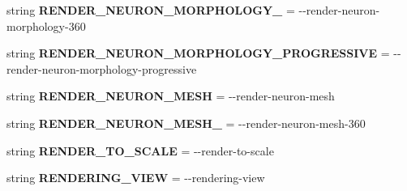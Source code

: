 \begin{DoxyCompactItemize}
\item 
string {\bfseries R\+E\+N\+D\+E\+R\+\_\+\+N\+E\+U\+R\+O\+N\+\_\+\+M\+O\+R\+P\+H\+O\+L\+O\+G\+Y\+\_} = \textquotesingle{}-\/-\/render-\/neuron-\/morphology-\/360\textquotesingle{}\hypertarget{classmeshy_1_1neuromorphovis_1_1interface_1_1cli_1_1args_1_1Args_a6297b735265b3cc48c2e38d07e1dd5dd}{}\label{classmeshy_1_1neuromorphovis_1_1interface_1_1cli_1_1args_1_1Args_a6297b735265b3cc48c2e38d07e1dd5dd}

\item 
string {\bfseries R\+E\+N\+D\+E\+R\+\_\+\+N\+E\+U\+R\+O\+N\+\_\+\+M\+O\+R\+P\+H\+O\+L\+O\+G\+Y\+\_\+\+P\+R\+O\+G\+R\+E\+S\+S\+I\+VE} = \textquotesingle{}-\/-\/render-\/neuron-\/morphology-\/progressive\textquotesingle{}\hypertarget{classmeshy_1_1neuromorphovis_1_1interface_1_1cli_1_1args_1_1Args_a1a1cd12d152f6aa891bcc73afd60eb0d}{}\label{classmeshy_1_1neuromorphovis_1_1interface_1_1cli_1_1args_1_1Args_a1a1cd12d152f6aa891bcc73afd60eb0d}

\item 
string {\bfseries R\+E\+N\+D\+E\+R\+\_\+\+N\+E\+U\+R\+O\+N\+\_\+\+M\+E\+SH} = \textquotesingle{}-\/-\/render-\/neuron-\/mesh\textquotesingle{}\hypertarget{classmeshy_1_1neuromorphovis_1_1interface_1_1cli_1_1args_1_1Args_ac73f530a8a91113efbb53d2807e688d8}{}\label{classmeshy_1_1neuromorphovis_1_1interface_1_1cli_1_1args_1_1Args_ac73f530a8a91113efbb53d2807e688d8}

\item 
string {\bfseries R\+E\+N\+D\+E\+R\+\_\+\+N\+E\+U\+R\+O\+N\+\_\+\+M\+E\+S\+H\+\_} = \textquotesingle{}-\/-\/render-\/neuron-\/mesh-\/360\textquotesingle{}\hypertarget{classmeshy_1_1neuromorphovis_1_1interface_1_1cli_1_1args_1_1Args_a20e953e7a5ece29ef9cb296820403179}{}\label{classmeshy_1_1neuromorphovis_1_1interface_1_1cli_1_1args_1_1Args_a20e953e7a5ece29ef9cb296820403179}

\item 
string {\bfseries R\+E\+N\+D\+E\+R\+\_\+\+T\+O\+\_\+\+S\+C\+A\+LE} = \textquotesingle{}-\/-\/render-\/to-\/scale\textquotesingle{}\hypertarget{classmeshy_1_1neuromorphovis_1_1interface_1_1cli_1_1args_1_1Args_a12d1a4a50aaf6a5e3fa6f553f2d102ba}{}\label{classmeshy_1_1neuromorphovis_1_1interface_1_1cli_1_1args_1_1Args_a12d1a4a50aaf6a5e3fa6f553f2d102ba}

\item 
string {\bfseries R\+E\+N\+D\+E\+R\+I\+N\+G\+\_\+\+V\+I\+EW} = \textquotesingle{}-\/-\/rendering-\/view\textquotesingle{}\hypertarget{classmeshy_1_1neuromorphovis_1_1interface_1_1cli_1_1args_1_1Args_aee6933590357c0b194cbfacda02346a1}{}\label{classmeshy_1_1neuromorphovis_1_1interface_1_1cli_1_1args_1_1Args_aee6933590357c0b194cbfacda02346a1}


\end{DoxyCompactItemize}
